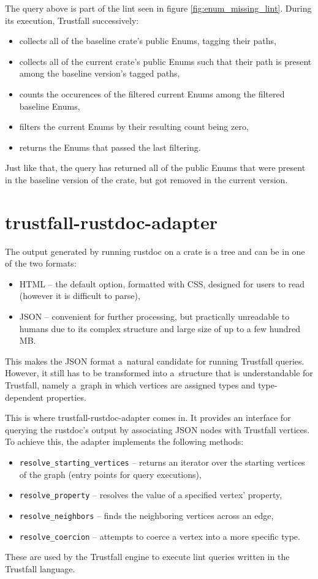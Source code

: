 \documentclass[licencjacka,en]{pracamgr}
\begin{document}
The query above is part of the lint seen in figure \ref{fig:enum_missing_lint}.
During its execution, Trustfall successively:
\begin{itemize}
	\item collects all of the baseline crate's public Enums, tagging their paths,
	\item collects all of the current crate's public Enums such that their path is present among
		the baseline version's tagged paths,
	\item counts the occurences of the filtered current Enums among the filtered baseline Enums,
	\item filters the current Enums by their resulting count being zero,
	\item returns the Enums that passed the last filtering.
\end{itemize}
Just like that, the query has returned all of the public Enums that were present in the baseline
version of the crate, but got removed in the current version.

\section{trustfall-rustdoc-adapter}\label{r:section_trustfall_rustdoc_adapter}
The output generated by running rustdoc on a crate is a tree and can be in one of the two formats:
\begin{itemize}
	\item HTML -- the default option, formatted with CSS, designed for users to read (however it is
		difficult to parse),
	\item JSON -- convenient for further processing, but practically unreadable to humans due to its
		complex structure and large size of up to a few hundred MB.
\end{itemize}
This makes the JSON format a~natural candidate for running Trustfall queries. However, it still has
to be transformed into a~structure that is understandable for Trustfall, namely a~graph in which
vertices are assigned types and type-dependent properties.

This is where trustfall-rustdoc-adapter comes in. It provides an interface for querying
the rustdoc's output by associating JSON nodes with Trustfall vertices. To achieve this, the adapter
implements the following methods:
\begin{itemize}
	\item \texttt{resolve\_starting\_vertices} -- returns an iterator over the starting vertices of
		the graph (entry points for query executions),
	\item \texttt{resolve\_property} -- resolves the value of a specified vertex' property,
	\item \texttt{resolve\_neighbors} -- finds the neighboring vertices across an edge,
	\item \texttt{resolve\_coercion} -- attempts to coerce a vertex into a more specific type.
\end{itemize}
These are used by the Trustfall engine to execute lint queries written in the Trustfall language.
\end{document}
